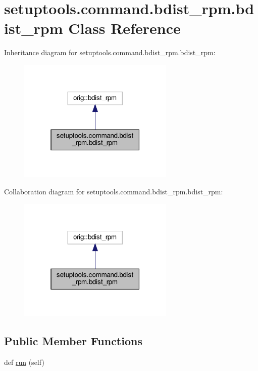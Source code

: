 \hypertarget{classsetuptools_1_1command_1_1bdist__rpm_1_1bdist__rpm}{}\section{setuptools.\+command.\+bdist\+\_\+rpm.\+bdist\+\_\+rpm Class Reference}
\label{classsetuptools_1_1command_1_1bdist__rpm_1_1bdist__rpm}


Inheritance diagram for setuptools.\+command.\+bdist\+\_\+rpm.\+bdist\+\_\+rpm\+:
\nopagebreak
\begin{figure}[H]
\begin{center}
\leavevmode
\includegraphics[width=211pt]{classsetuptools_1_1command_1_1bdist__rpm_1_1bdist__rpm__inherit__graph}
\end{center}
\end{figure}


Collaboration diagram for setuptools.\+command.\+bdist\+\_\+rpm.\+bdist\+\_\+rpm\+:
\nopagebreak
\begin{figure}[H]
\begin{center}
\leavevmode
\includegraphics[width=211pt]{classsetuptools_1_1command_1_1bdist__rpm_1_1bdist__rpm__coll__graph}
\end{center}
\end{figure}
\subsection*{Public Member Functions}
\begin{DoxyCompactItemize}
\item 
def \hyperlink{classsetuptools_1_1command_1_1bdist__rpm_1_1bdist__rpm_af4bf74a4d1fcf5869be29590fd1b4287}{run} (self)
\end{DoxyCompactItemize}


